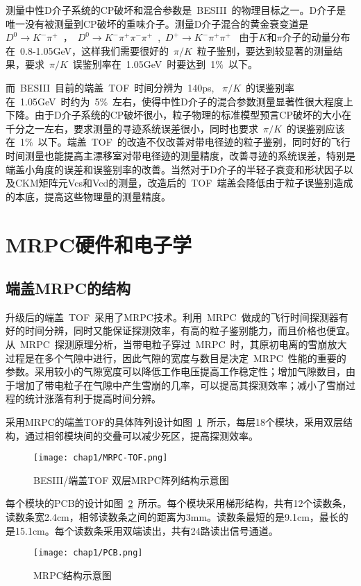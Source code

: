 测量中性D介子系统的CP破坏和混合参数是~BESIII~的物理目标之一。D介子是唯一没有被测量到CP破坏的重味介子。测量D介子混合的黄金衰变道是~$D^0 \to K^- \pi^+$~，~$D^0 \to K^- \pi^+\pi^-\pi^+$~,~$D^+ \to K^- \pi^+\pi^+$~
由于$K$和$\pi$介子的动量分布在~0.8-1.05GeV，这样我们需要很好的~$\pi/K$~粒子鉴别，要达到较显著的测量结果，要求~$\pi/K$~误鉴别率在~1.05GeV~时要达到~1$\%$~以下。

而~BESIII~目前的端盖~TOF~时间分辨为~140ps, ~$\pi/K$~的误鉴别率在~1.05GeV~时约为~5$\%$~左右，使得中性D介子的混合参数测量显著性很大程度上下降。由于D介子系统的CP破坏很小，粒子物理的标准模型预言CP破坏的大小在千分之一左右，要求测量的寻迹系统误差很小，同时也要求~$\pi/K$~的误鉴别应该在~1$\%$~以下。端盖~TOF~的改造不仅改善对带电径迹的粒子鉴别，同时好的飞行时间测量也能提高主漂移室对带电径迹的测量精度，改善寻迹的系统误差，特别是端盖小角度的误差和误鉴别率的改善。当然对于D介子的半轻子衰变和形状因子以及CKM矩阵元Vcs和Vcd的测量，改造后的~TOF~端盖会降低由于粒子误鉴别造成的本底，提高这些物理量的测量精度。 

\section{MRPC硬件和电子学}
\subsection{端盖MRPC的结构}
升级后的端盖~TOF~采用了MRPC技术。利用~MRPC~做成的飞行时间探测器有好的时间分辨，同时又能保证探测效率，有高的粒子鉴别能力，而且价格也便宜。从~MRPC~探测原理分析，当带电粒子穿过~MRPC~时，其原初电离的雪崩放大过程是在多个气隙中进行，因此气隙的宽度与数目是决定~MRPC~性能的重要的参数。采用较小的气隙宽度可以降低工作电压提高工作稳定性；增加气隙数目，由于增加了带电粒子在气隙中产生雪崩的几率，可以提高其探测效率；减小了雪崩过程的统计涨落有利于提高时间分辨。

采用MRPC的端盖TOF的具体阵列设计如图~\ref{fig:MRPC-TOF}~所示，每层18个模块，采用双层结构，通过相邻模块间的交叠可以减少死区，提高探测效率。
\begin{figure}[!h]
  \centering
  \texttt{[image: chap1/MRPC-TOF.png]}
  \caption{BESIII/端盖TOF 双层MRPC阵列结构示意图}
  \label{fig:MRPC-TOF}
\end{figure}

每个模块的PCB的设计如图~\ref{fig:PCB}~所示。每个模块采用梯形结构，共有12个读数条，读数条宽2.4cm，相邻读数条之间的距离为3mm。读数条最短的是9.1cm，最长的是15.1cm。每个读数条采用双端读出，共有24路读出信号通道。

\begin{figure}[!h]
  \centering
  \texttt{[image: chap1/PCB.png]}
  \caption{MRPC结构示意图}
  \label{fig:PCB}
\end{figure}

